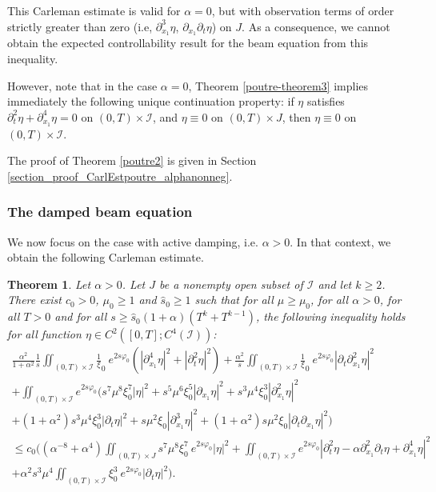 \documentclass[a4paper, 12pt]{article}
\def\textit{} %
\theoremstyle{plain}
\newtheorem{theorem}{Theorem}[section]
\theoremstyle{definition}
\numberwithin{theorem}{section}
\numberwithin{equation}{section}
\begin{document}
This Carleman estimate is valid for $\alpha=0$, but with observation terms of order strictly greater than zero (i.e, $\partial^3_{x_1}\eta$, $\partial_{x_1}\partial_t \eta$) on $J$. As a consequence, we cannot obtain the expected controllability result for the beam equation from this inequality.




However, note that in the case $\alpha = 0$, Theorem \ref{poutre-theorem3} implies immediately the following unique continuation property: if $\eta$ satisfies $\partial^2_t \eta + \partial^4_{x_1} \eta = 0$ on $(0,T)\times \mathcal I$, and $\eta \equiv 0$ on $(0,T) \times J$, then $\eta \equiv 0$ on $(0,T) \times \mathcal I$.


The proof of Theorem \ref{poutre2} is given in Section \ref{section_proof_CarlEstpoutre_alphanonneg}.


\subsubsection{The damped beam equation}

We now focus on the case with active damping, \textit{i.e.} $\alpha > 0$. In that context, we obtain the following Carleman estimate.

\begin{theorem}\label{poutre}
 Let $\alpha>0$. Let $J$ be a nonempty open subset of $\mathcal{I}$ and let $k\geq 2$. There exist $c_0>0$, $\mu_0\geq 1$ and $\widehat{s}_0\geq 1$ such that for all $\mu\geq\mu_0$, for all $\alpha>0$, for all $T>0$ and for all $s\geq \widehat{s}_0(1+\alpha)(T^k+T^{k-1})$, the following inequality holds for all function $\eta\in C^2([0,T];C^4(\mathcal{I}))$:
\begin{multline}\label{poutre-theorem}
\frac{\alpha^2}{1+\alpha^2}\frac1s\iint_{(0,T)\times\mathcal{I}}\frac1\xi_0~e^{2s\varphi_0}(|\partial^4_{x_1}\eta|^2+|\partial^2_t\eta|^2)+\frac{\alpha^2}{s}\iint_{(0,T)\times\mathcal{I}}\frac1\xi_0~e^{2s\varphi_0}|\partial_t\partial^2_{x_1}\eta|^2\\
+\iint_{(0,T)\times\mathcal{I}}e^{2s\varphi_0}\Big(s^7\mu^8\xi^7_0|\eta|^2+s^5\mu^6\xi_0^5|\partial_{x_1}\eta|^2+s^3\mu^4\xi_0^3|\partial^2_{x_1}\eta|^2\\+(1+\alpha^2)s^3\mu^4\xi_0^3|\partial_t\eta|^2+s\mu^2\xi_0|\partial^3_{x_1}\eta|^2+(1+\alpha^2)s\mu^2\xi_0|\partial_t\partial_{x_1}\eta|^2\Big)\\
\leq c_0\Big(\left(\alpha^{-8}+\alpha^4\right)\iint_{(0,T)\times J}s^7\mu^8\xi^7_0~e^{2s\varphi_0}|\eta|^2+\iint_{(0,T)\times\mathcal{I}}e^{2s\varphi_0}|\partial^2_t\eta-\alpha\partial^2_{x_1}\partial_t\eta+\partial^4_{x_1}\eta|^2\\
+\alpha^2 s^3\mu^4\iint_{(0,T)\times\mathcal{I}}\xi_0^3~ e^{2s\varphi_0}|\partial_t\eta|^2\Big).
\end{multline} 
\end{theorem}
\end{document}
